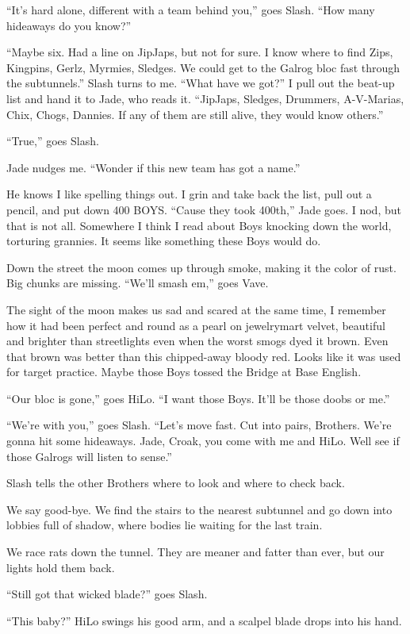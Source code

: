 ``It's hard alone, different with a team behind you,'' goes Slash. ``How many hideaways do you know?''

“Maybe six. Had a line on JipJaps, but not for sure. I know where to find Zips, Kingpins, Gerlz, Myrmies, Sledges. We could get to the Galrog bloc fast through the subtunnels.”
Slash turns to me. “What have we got?”
I pull out the beat-up list and hand it to Jade, who reads it. “JipJaps, Sledges, Drummers, A-V-Marias, Chix, Chogs, Dannies. If any of them are still alive, they would know others.”

``True,'' goes Slash.

Jade nudges me. ``Wonder if this new team has got a name.''

He knows I like spelling things out. I grin and take back the list, pull out a pencil, and put down 400 BOYS.
“Cause they took 400th,” Jade goes. I nod, but that is not all. Somewhere I think I read about Boys knocking down the world, torturing grannies. It seems like something these Boys would do.

Down the street the moon comes up through smoke, making it the color of rust. Big chunks are missing.
``We'll smash em,'' goes Vave.

The sight of the moon makes us sad and scared at the same time, I remember how it had been perfect and round as a pearl on jewelrymart velvet, beautiful and brighter than streetlights even when the worst smogs dyed it brown. Even that brown was better than this chipped-away bloody red. Looks like it was used for target practice. Maybe those Boys tossed the Bridge at Base English.

“Our bloc is gone,” goes HiLo. “I want those Boys. It'll be those doobs or me.”

“We're with you,” goes Slash. “Let's move fast. Cut into pairs, Brothers. We're gonna hit some hideaways. Jade, Croak, you come with me and HiLo. Well see if those Galrogs will listen to sense.”

Slash tells the other Brothers where to look and where to check back.

We say good-bye. We find the stairs to the nearest subtunnel and go down into lobbies full of shadow, where bodies lie waiting for the last train.

We race rats down the tunnel. They are meaner and fatter than ever, but our lights hold them back.

“Still got that wicked blade?” goes Slash.

“This baby?” HiLo swings his good arm, and a scalpel blade drops into his hand.

